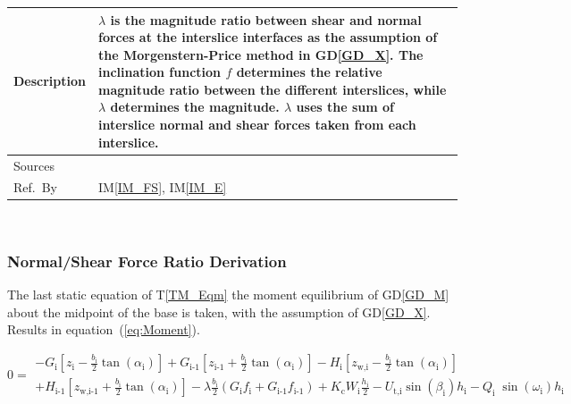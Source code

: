 \documentclass[12pt]{article}
\newcommand{\colAwidth}{0.13\textwidth}
\newcommand{\colBwidth}{0.82\textwidth}
\newcommand{\tref}[1]{T\ref{#1}}
\newcommand{\iref}[1]{IM\ref{#1}}
\newcommand{\dref}[1]{GD\ref{#1}}
\begin{document}
\begin{minipage}{\textwidth}
\begin{tabular}{| p{\colAwidth} | p{\colBwidth} |}
\hline Description & $\lambda$ is the magnitude ratio between shear
and normal forces at the interslice interfaces as the assumption of
the Morgenstern-Price method in \dref{GD_X}. The inclination function
$f$ determines the relative magnitude ratio between the different
interslices, while $\lambda$ determines the magnitude. $\lambda$ uses
the sum of interslice normal and shear forces taken from each
interslice. \\

\hline Sources& \cite{ZhuEtAl2005}\\

\hline Ref.\ By & \iref{IM_FS}, \iref{IM_E} \\

\hline
\end{tabular}
\end{minipage}\\


\subsubsection*{Normal/Shear Force Ratio Derivation}

 The last static equation of \tref{TM_Eqm} the moment equilibrium of
 \dref{GD_M} about the midpoint of the base is taken, with the
 assumption of \dref{GD_X}. Results in equation~(\ref{eq:Moment}).

\begin{equation}\label{eq:Moment}
  0 = \begin{array}{l} - {G}_{\text{i}} \left[ {z_{\text{i}}} -
      \frac{b_{\text{i}}}{2} { \tan\left(\alpha_{\text{i}}\right)}
      \right] + {G}_{\text{i-1}} \left[ {z_{\text{i-1}}} +
      \frac{b_{\text{i}}}{2} { \tan\left(\alpha_{\text{i}}\right)}
      \right] - H_{\text{i}}\left[ z_{\text{w,i}} -
      \frac{b_{\text{i}}}{2} { \tan\left(\alpha_{\text{i}}\right)}
      \right] \\[5pt] + H_{\text{i-1}}\left[ z_{\text{w,i-1}} +
      \frac{b_{\text{i}}}{2} { \tan\left(\alpha_{\text{i}}\right)}
      \right] -\lambda \frac{b_{\text{i}}}{2} \left( G_{\text{i}}
    f_{\text{i}} + G_{\text{i-1}} f_{\text{i-1}} \right) +
    K_{\text{c}} W_{\text{i}} \frac{h_{\text{i}}}{2} - U_{\text{t,i}}
    \sin\left(\beta_{\text{i}}\right) h_{\text{i}} -
    Q_{\text{i}}\;{\sin\left(\omega_{\text{i}}\right)}
    h_{\text{i}} \end{array}
\end{equation} 
\end{document}
